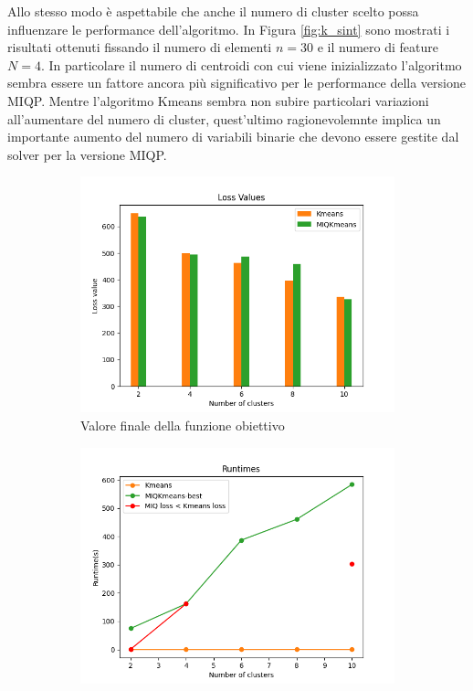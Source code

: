 \documentclass{article}
\begin{document}
    Allo stesso modo è aspettabile che anche il numero di cluster scelto possa influenzare le performance dell'algoritmo. In Figura \ref{fig:k_sint} sono mostrati i risultati ottenuti fissando il numero di elementi $n=30$ e il numero di feature $N=4$. In particolare il numero di centroidi con cui viene inizializzato l'algoritmo sembra essere un fattore ancora più significativo per le performance della versione MIQP.
    Mentre l'algoritmo Kmeans sembra non subire particolari variazioni all'aumentare del numero di cluster, quest'ultimo ragionevolemnte implica un importante aumento del numero di variabili binarie che devono essere gestite dal solver per la versione MIQP.\\
    \begin{figure}[H]
     \centering
     \begin{subfigure}[t]{0.49\linewidth}
         \centering
         \includegraphics[width=\linewidth]{../results/plots/loss_centers_sint}
         \caption{Valore finale della funzione obiettivo}
     \end{subfigure}
     \hfill
     \begin{subfigure}[t]{0.49\linewidth}
         \centering
         \includegraphics[width=\linewidth]{../results/plots/runtime_centers_sint}

\end{subfigure}
\end{figure}
\end{document}
